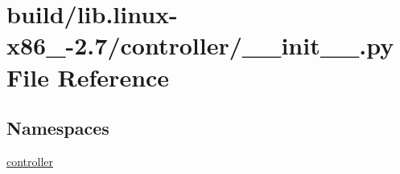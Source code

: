 \hypertarget{build_2lib_8linux-x86__64-2_87_2controller_2____init_____8py}{}\section{build/lib.linux-\/x86\+\_-\/2.7/controller/\+\_\+\+\_\+init\+\_\+\+\_\+.py File Reference}
\label{build_2lib_8linux-x86__64-2_87_2controller_2____init_____8py}
\subsection*{Namespaces}
\begin{DoxyCompactItemize}
\item 
 \hyperlink{namespacecontroller}{controller}
\end{DoxyCompactItemize}
